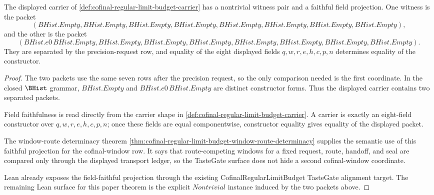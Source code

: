 \begin{theorem}
\label{thm:cofinal-regular-limit-budget-tastegate-witness-surface}
The displayed carrier of \autoref{def:cofinal-regular-limit-budget-carrier} has a nontrivial witness pair and a faithful field projection. One witness is the packet
$$
(BHist.Empty,BHist.Empty,BHist.Empty,BHist.Empty,BHist.Empty,BHist.Empty,BHist.Empty,BHist.Empty),
$$
and the other is the packet
$$
(BHist.e0\,BHist.Empty,BHist.Empty,BHist.Empty,BHist.Empty,BHist.Empty,BHist.Empty,BHist.Empty,BHist.Empty).
$$
They are separated by the precision-request row, and equality of the eight displayed fields $q,w,r,e,h,c,p,n$ determines equality of the constructor.
\end{theorem}
\begin{proof}
The two packets use the same seven rows after the precision request, so the only comparison needed is the first coordinate. In the closed $\BHist$ grammar, $BHist.Empty$ and $BHist.e0\,BHist.Empty$ are distinct constructor forms. Thus the displayed carrier contains two separated packets.

Field faithfulness is read directly from the carrier shape in \autoref{def:cofinal-regular-limit-budget-carrier}. A carrier is exactly an eight-field constructor over $q,w,r,e,h,c,p,n$; once these fields are equal componentwise, constructor equality gives equality of the displayed packet.

The window-route determinacy theorem \autoref{thm:cofinal-regular-limit-budget-window-route-determinacy} supplies the semantic use of this faithful projection for the cofinal-window row. It says that route-competing windows for a fixed request, route, handoff, and seal are compared only through the displayed transport ledger, so the TasteGate surface does not hide a second cofinal-window coordinate.

Lean already exposes the field-faithful projection through the existing CofinalRegularLimitBudget TasteGate alignment target. The remaining Lean surface for this paper theorem is the explicit $Nontrivial$ instance induced by the two packets above.
\end{proof}
